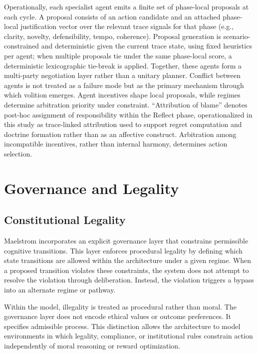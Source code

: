 \documentclass[11pt,a4paper]{article}
\begin{document}
Operationally, each specialist agent emits a finite set of phase-local proposals at each cycle. A proposal consists of an action candidate and an attached phase-local justification vector over the relevant trace signals for that phase (e.g., clarity, novelty, defensibility, tempo, coherence). Proposal generation is scenario-constrained and deterministic given the current trace state, using fixed heuristics per agent; when multiple proposals tie under the same phase-local score, a deterministic lexicographic tie-break is applied. Together, these agents form a multi-party negotiation layer rather than a unitary planner. Conflict between agents is not treated as a failure mode but as the primary mechanism through which volition emerges. Agent incentives shape local proposals, while regimes determine arbitration priority under constraint. ``Attribution of blame'' denotes post-hoc assignment of responsibility within the Reflect phase, operationalized in this study as trace-linked attribution used to support regret computation and doctrine formation rather than as an affective construct. Arbitration among incompatible incentives, rather than internal harmony, determines action selection.

\section{Governance and Legality}

\subsection{Constitutional Legality}

Maelstrom incorporates an explicit governance layer that constrains permissible cognitive transitions. This layer enforces procedural legality by defining which state transitions are allowed within the architecture under a given regime. When a proposed transition violates these constraints, the system does not attempt to resolve the violation through deliberation. Instead, the violation triggers a bypass into an alternate regime or pathway.

Within the model, illegality is treated as procedural rather than moral. The governance layer does not encode ethical values or outcome preferences. It specifies admissible process. This distinction allows the architecture to model environments in which legality, compliance, or institutional rules constrain action independently of moral reasoning or reward optimization.
\end{document}
